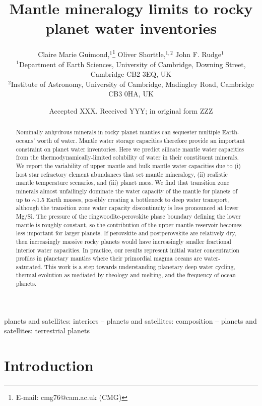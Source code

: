 \documentclass[fleqn,usenatbib]{mnras}
\title[Rocky planet water inventories]{Mantle mineralogy limits to rocky planet water inventories}
\author[C. M. Guimond et al.]{
Claire Marie Guimond,$^{1}$\thanks{E-mail: cmg76@cam.ac.uk (CMG)}
Oliver Shorttle,$^{1,2}$
John F. Rudge$^{1}$
\\
$^{1}$Department of Earth Sciences, University of Cambridge, Downing Street, Cambridge CB2 3EQ, UK\\
$^{2}$Institute of Astronomy, University of Cambridge, Madingley Road, Cambridge CB3 0HA, UK
}
\date{Accepted XXX. Received YYY; in original form ZZZ}
\begin{document}
\label{firstpage}
\pagerange{\pageref{firstpage}--\pageref{lastpage}}
\maketitle


\begin{abstract}
Nominally anhydrous minerals in rocky planet mantles can sequester multiple Earth-oceans' worth of water. Mantle water storage capacities therefore provide an important constraint on planet water inventories. Here we predict silicate mantle water capacities from the thermodynamically-limited solubility of water in their constituent minerals. We report the variability of upper mantle and bulk mantle water capacities due to (i) host star refractory element abundances that set mantle mineralogy, (ii) realistic mantle temperature scenarios, and (iii) planet mass. We find that transition zone minerals almost unfailingly dominate the water capacity of the mantle for planets of up to $\sim$1.5 Earth masses, possibly creating a bottleneck to deep water transport, although the transition zone water capacity discontinuity is less pronounced at lower Mg/Si. The pressure of the ringwoodite-perovskite phase boundary defining the lower mantle is roughly constant, so the contribution of the upper mantle reservoir becomes less important for larger planets. If perovskite and postperovskite are relatively dry, then increasingly massive rocky planets would have increasingly smaller fractional interior water capacities. In practice, our results represent initial water concentration profiles in planetary mantles where their primordial magma oceans are water-saturated. This work is a step towards understanding planetary deep water cycling, thermal evolution as mediated by rheology and melting, and the frequency of ocean planets.

\end{abstract}

\begin{keywords}
planets and satellites: interiors -- planets and satellites: composition -- planets and satellites: terrestrial planets
\end{keywords}


\section{Introduction}
\end{document}
